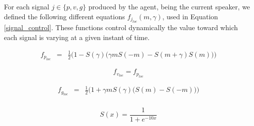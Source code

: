 For each signal $j \in \lbrace p,v,g \rbrace$ produced by the agent, being the current speaker, we defined the following different equations $f_{j_{loc}}(m,\gamma)$, used in Equation \ref{signal_control}.
These functions control dynamically the value toward which each signal is varying at a given instant of time.

\begin{equation}
\begin{array}{lcl}
f_{p_{loc}} & = &  \frac{1}{2}\Big( 1 - S(\gamma) \big( \gamma m S(-m) - S(m+\gamma)S(m) \big) \Big)
\end{array}
\label{eq_speaker_pitch}
\end{equation}

\begin{equation}
f_{v_{loc}} = f_{p_{loc}}
\label{eq_speaker_volume}
\end{equation}

\begin{equation}
\begin{array}{lcl}
f_{g_{loc}}&=& \frac{1}{2}\Big( 1+\gamma m S(\gamma) \big(S(m) - S(-m)\big) \Big)\\
\end{array}
\label{eq_speaker_gaze}
\end{equation}

\begin{equation}
S(x) = \frac{1}{1+e^{-10x}}
\label{eq_sigmoid}
\end{equation}


